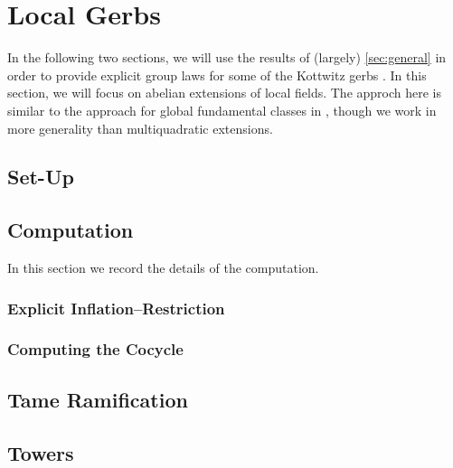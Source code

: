 \documentclass{amsart}
\numberwithin{equation}{section}
\begin{document}
\section{Local Gerbs} \label{sec:local}
In the following two sections, we will use the results of (largely) \autoref{sec:general} in order to provide explicit group laws for some of the Kottwitz gerbs \cite{kottwitz}. In this section, we will focus on abelian extensions of local fields. The approch here is similar to the approach for global fundamental classes in \cite{explicit-fund-classes}, though we work in more generality than multiquadratic extensions.

\subsection{Set-Up} \label{sec:setup}


\subsection{Computation}
In this section we record the details of the computation.

\subsubsection{Explicit Inflation--Restriction}


\subsubsection{Computing the Cocycle}


% 

% 

\subsection{Tame Ramification}


\subsection{Towers}

\end{document}
